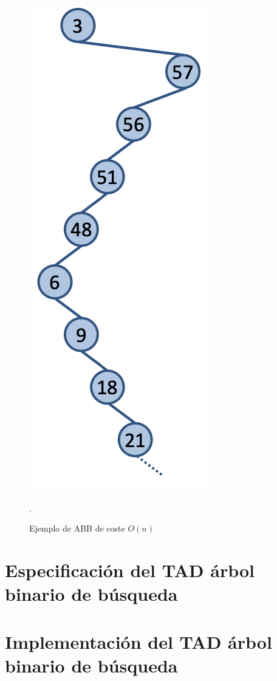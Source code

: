\vspace*{-5cm}
\begin{figure}[h]
  \begin{center}
    \hspace*{11.5cm}
    \includegraphics[width=.15\textwidth]{assets/abb3.png}
  \end{center}
  \caption{Ejemplo de ABB de coste \(O(n)\)}.
\end{figure}

\section{Especificación del TAD árbol binario de búsqueda}

\section{Implementación del TAD árbol binario de búsqueda}



